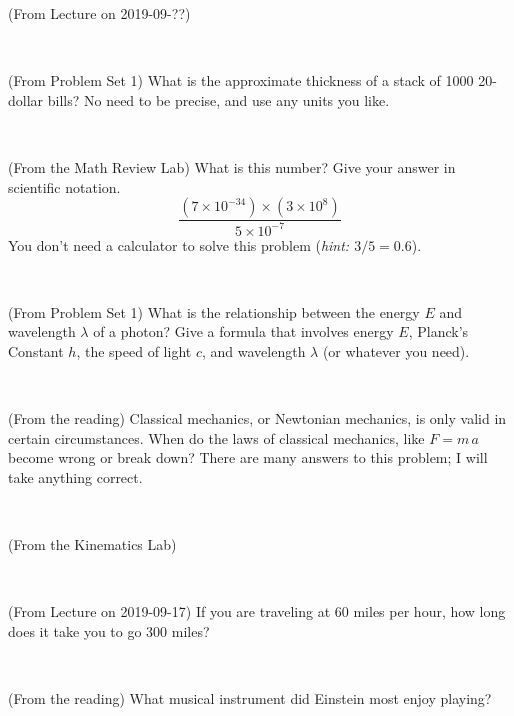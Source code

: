 \documentclass[12pt, letterpaper]{article}
\begin{document}
\begin{problem} (From Lecture on 2019-09-??)
\end{problem}


\vfill ~

\begin{problem} (From Problem Set 1)
What is the approximate thickness of a stack of 1000 20-dollar bills?
No need to be precise, and use any units you like.
\end{problem}


\vfill ~

\begin{problem} (From the Math Review Lab)
What is this number? Give your answer in scientific notation.
$$
\frac{(7\times10^{-34})\times(3\times10^8)}{5\times10^{-7}}
$$
You don't need a calculator to solve this problem (\textit{hint: $3/5=0.6$}).
\end{problem}


\vfill ~

\begin{problem} (From Problem Set 1)
What is the relationship between the energy $E$ and wavelength
$\lambda$ of a photon? Give a formula that involves energy $E$,
Planck's Constant $h$, the speed of light $c$, and wavelength
$\lambda$ (or whatever you need).
\end{problem}

\vfill ~


\clearpage


\begin{problem} (From the reading)
Classical mechanics, or Newtonian mechanics, is only valid in certain
circumstances. When do the laws of classical mechanics, like $F =
m\,a$ become wrong or break down? There are many answers to this
problem; I will take anything correct.
\end{problem}


\vfill ~

\begin{problem} (From the Kinematics Lab)

\end{problem}


\vfill ~

\begin{problem} (From Lecture on 2019-09-17)
If you are traveling at 60 miles per hour, how long does
it take you to go 300 miles?
\end{problem}


\vfill ~

\begin{problem} (From the reading)
What musical instrument did Einstein most enjoy playing?
\end{problem}
\end{document}
